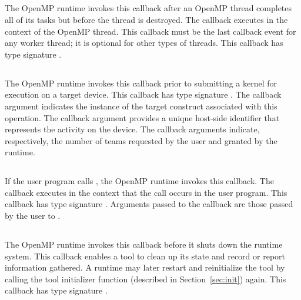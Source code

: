 \subsection{}
The OpenMP runtime invokes this callback
after an OpenMP thread completes all of
its tasks but before the thread is destroyed. The callback
executes in the context of the OpenMP thread. This callback must be the last callback event for any worker thread; it is optional for other types of threads.
This callback has type signature .

\subsection{}

The OpenMP runtime invokes this callback prior to submitting a kernel for execution on a target device.
This callback has type signature .
The callback argument  indicates the instance of the target construct associated with this operation.
The callback argument  provides a unique host-side identifier that represents the activity on the device.
The callback arguments    indicate, respectively, the number of teams requested by the user and granted by the runtime.

\subsection{}
\label{subsec:ompt_event_control}
If the user program calls , the
OpenMP runtime invokes this callback.
The callback executes in the context that the call occurs in the user program.
This callback has type signature .
Arguments passed to the callback are those passed by the user to .

\subsection{}
The OpenMP runtime invokes this callback before it shuts down the
 runtime system.  This callback enables a tool to clean up its
 state and record or report information gathered. A runtime may later restart and reinitialize the tool by
calling the tool initializer
function (described in Section~\ref{sec:init}) again.
 This callback has type signature .

